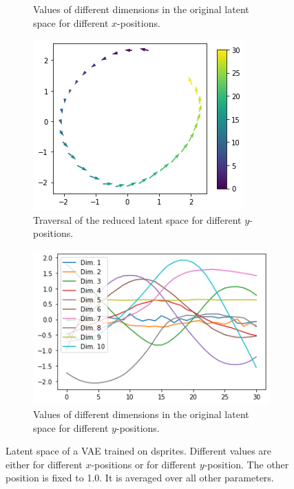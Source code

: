 \begin{figure}
\begin{subfigure}{.48\textwidth}
        \caption{Values of different dimensions in the original latent space for different $x$-positions.}
        \label{subfig:vae_dsprites_x_pos_dim_values}
    \end{subfigure}
    \begin{subfigure}{.48\textwidth}
        \includegraphics[width=\textwidth]{images/latent_space_traversals/vae_dsprites_position_latent_space_route_y.png}
        \caption{Traversal of the reduced latent space for different $y$-positions.}
        \label{subfig:vae_dsprites_y_pos_latent_space_route}
    \end{subfigure}
    \hfill
    \begin{subfigure}{.48\textwidth}
        \includegraphics[width=\textwidth]{images/latent_space_traversals/vae_dsprites_position_latent_space_values_y.png}
        \caption{Values of different dimensions in the original latent space for different $y$-positions.}
        \label{subfig:vae_dsprites_y_pos_dim_values}
    \end{subfigure}
    \caption[\ac{VAE} on dsprites: Latent Space Values]{Latent space of a \ac{VAE} trained on dsprites. Different values are either for different $x$-positions or for different $y$-position. The other position is fixed to 1.0. It is averaged over all other parameters.}
    \label{fig:vae_dsprites_latent_space_x_position}
\end{figure}
